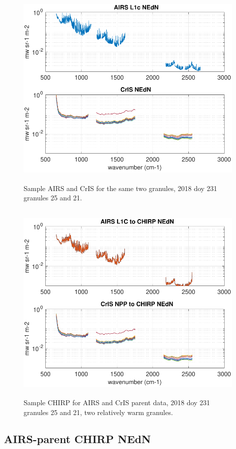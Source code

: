 \documentclass[12pt]{article}
\begin{document}
\begin{figure}
  \centering
  \includegraphics[height=10cm]{figures/sample_airs_and_cris_nedn.pdf}
  \caption{Sample AIRS and CrIS {\nedn} for the same two granules,
    2018 doy 231 granules 25 and 21.}
  \label{fig11}
\end{figure}

\begin{figure}
  \centering
  \includegraphics[height=10cm]{figures/chirp_nedn_from_airs_and_cris.pdf}
  \caption{Sample CHIRP {\nedn} for AIRS and CrIS parent data, 2018
    doy 231 granules 25 and 21, two relatively warm granules.}
  \label{fig12}
\end{figure}

\subsection{AIRS-parent CHIRP NEdN}
\end{document}
